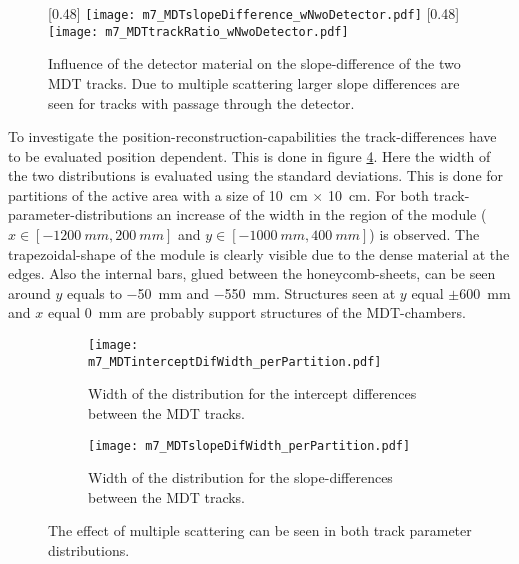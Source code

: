 \documentclass[
twoside,            %
BCOR1.4cm,          %
10pt,               %
headings=normal,    %
headsepline,        %
clearplainpage,		%
final,              %
div=14,
open=right,
bibliography=toc
]{scrreprt}
\begin{document}
\begin{figure}[!h]
	\centering
	[0.48\textwidth]
	{\texttt{[image: m7\_MDTslopeDifference\_wNwoDetector.pdf]}}
	\hfill
	[0.48\textwidth]
	{\texttt{[image: m7\_MDTtrackRatio\_wNwoDetector.pdf]}}
	\vspace{-2mm}
	\caption{
		Influence of the detector material on the slope-difference of the two MDT tracks.
		Due to multiple scattering larger slope differences are seen for tracks with passage through the detector.
	}
	\label{slopeDifferences}
\end{figure}

To investigate the position-reconstruction-capabilities the track-differences have to be evaluated position dependent.
This is done in figure \ref{trackDifferencesPP}.
Here the width of the two distributions is evaluated using the standard deviations.
This is done for partitions of the active area with a size of \SI{10}{cm} $\times$ \SI{10}{cm}.
For both track-parameter-distributions an increase of the width in the region of the module ($x \in [-\SI{1200}{mm},\SI{200}{mm}]$ and $y \in [-\SI{1000}{mm},\SI{400}{mm}]$) is observed.
The trapezoidal-shape of the module is clearly visible due to the dense material at the edges.
Also the internal bars, glued between the honeycomb-sheets, can be seen around $y$ equals to \SI{-50}{mm} and \SI{-550}{mm}.
Structures seen at $y$ equal $\pm$\SI{600}{mm} and $x$ equal \SI{0}{mm} are probably support structures of the MDT-chambers.

\begin{figure}[!h]
	\begin{subfigure}[b]{0.48\textwidth}
		\centering
		\texttt{[image: m7\_MDTinterceptDifWidth\_perPartition.pdf]}
		\caption{Width of the distribution for the intercept differences between the MDT tracks.}
		\label{m7_MDTinterceptDifWidth_perPartition} 
	\end{subfigure}
	\hfill
	\begin{subfigure}[b]{0.48\textwidth}
		\centering
		\texttt{[image: m7\_MDTslopeDifWidth\_perPartition.pdf]}
		\caption{Width of the distribution for the slope-differences between the MDT tracks.}
		\label{m7_MDTslopeDifWidth_perPartition} 
	\end{subfigure}
	\vspace{-2mm}
	\caption{
		The effect of multiple scattering can be seen in both track parameter distributions.
	}
	\label{trackDifferencesPP}
\end{figure}
\end{document}
